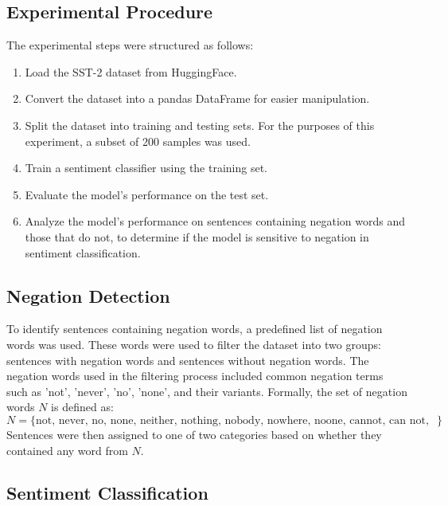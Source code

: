 \documentclass{article}
\begin{document}
\subsection{Experimental Procedure}

The experimental steps were structured as follows:
\begin{enumerate}
    \item Load the SST-2 dataset from HuggingFace.
    \item Convert the dataset into a pandas DataFrame for easier manipulation.
    \item Split the dataset into training and testing sets. For the purposes of this experiment, a subset of 200 samples was used.
    \item Train a sentiment classifier using the training set.
    \item Evaluate the model's performance on the test set.
    \item Analyze the model's performance on sentences containing negation words and those that do not, to determine if the model is sensitive to negation in sentiment classification.
\end{enumerate}

\subsection{Negation Detection}

To identify sentences containing negation words, a predefined list of negation words was used. These words were used to filter the dataset into two groups: sentences with negation words and sentences without negation words. The negation words used in the filtering process included common negation terms such as 'not', 'never', 'no', 'none', and their variants. Formally, the set of negation words $ N $ is defined as:
$$
N = \{ \text{not, never, no, none, neither, nothing, nobody, nowhere, noone, cannot, can not, should not, will not, would not, might not, could not, must not, had not, has not, have not, did not, does not, do not, is not, are not, was not, were not, has not, had not, will not, would not, could not, should not, may not, might not, must not, can not, cannot, don't, doesn't, didn't, isn't, aren't, wasn't, weren't, haven't, hadn't, will't, would't, could't, should't, may't, might't, must't, can't} \}
$$
Sentences were then assigned to one of two categories based on whether they contained any word from $ N $.

\subsection{Sentiment Classification}
\end{document}
